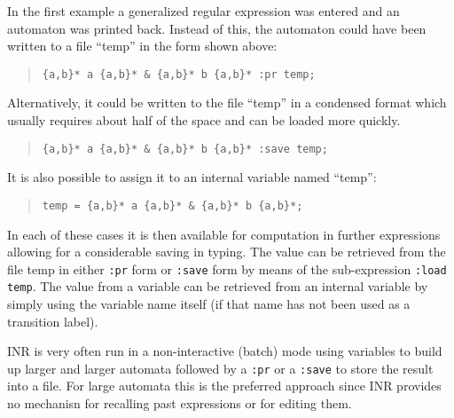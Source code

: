 In the first example a generalized regular expression was entered and an
automaton was printed back.
Instead of this, the automaton could have been written to a file ``temp''
in the form shown above:
\begin{quote}
\begin{verbatim}
{a,b}* a {a,b}* & {a,b}* b {a,b}* :pr temp;
\end{verbatim}
\end{quote}
Alternatively, it could be written to the file ``temp'' in a condensed
format which usually requires about half of the space and can be loaded more
quickly.
\begin{quote}
\begin{verbatim}
{a,b}* a {a,b}* & {a,b}* b {a,b}* :save temp;
\end{verbatim}
\end{quote}
It is also possible to assign it to an internal variable named ``temp'':
\begin{quote}
\begin{verbatim}
temp = {a,b}* a {a,b}* & {a,b}* b {a,b}*;
\end{verbatim}
\end{quote}
In each of these cases it is then available for computation in further
expressions allowing for a considerable saving in typing.
The value can be retrieved from the file temp in either {\tt :pr} form or
{\tt :save} form by means of the sub-expression {\tt :load temp}.
The value from a variable can be retrieved from an internal variable by
simply using the variable name itself (if that name has not been used as a
transition label).

INR is very often run in a non-interactive (batch) mode using variables to
build up larger and larger automata followed by a \verb#:pr# or a
\verb#:save# to store the result into a file.
For large automata this is the preferred approach since INR provides no
mechanisn for recalling past expressions or for editing them.
